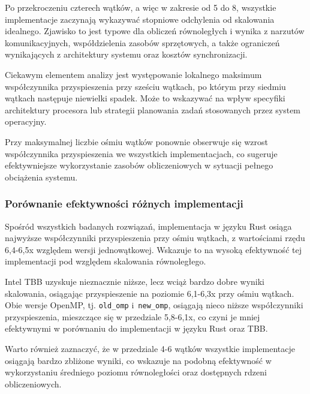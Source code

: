 Po przekroczeniu czterech wątków, a więc w zakresie od 5 do 8, wszystkie implementacje zaczynają wykazywać stopniowe odchylenia od skalowania idealnego. Zjawisko to jest typowe dla obliczeń równoległych i wynika z narzutów komunikacyjnych, współdzielenia zasobów sprzętowych, a także ograniczeń wynikających z architektury systemu oraz kosztów synchronizacji.

Ciekawym elementem analizy jest występowanie lokalnego maksimum współczynnika przyspieszenia przy sześciu wątkach, po którym przy siedmiu wątkach następuje niewielki spadek. Może to wskazywać na wpływ specyfiki architektury procesora lub strategii planowania zadań stosowanych przez system operacyjny.

Przy maksymalnej liczbie ośmiu wątków ponownie obserwuje się wzrost współczynnika przyspieszenia we wszystkich implementacjach, co sugeruje efektywniejsze wykorzystanie zasobów obliczeniowych w sytuacji pełnego obciążenia systemu.

\subsubsection{Porównanie efektywności różnych implementacji}
Spośród wszystkich badanych rozwiązań, implementacja w języku Rust osiąga najwyższe współczynniki przyspieszenia przy ośmiu wątkach, z wartościami rzędu 6,4-6,5x względem wersji jednowątkowej. Wskazuje to na wysoką efektywność tej implementacji pod względem skalowania równoległego.

Intel TBB uzyskuje nieznacznie niższe, lecz wciąż bardzo dobre wyniki skalowania, osiągając przyspieszenie na poziomie 6,1-6,3x przy ośmiu wątkach. Obie wersje OpenMP, tj. \texttt{old\_omp} i~\texttt{new\_omp}, osiągają nieco niższe współczynniki przyspieszenia, mieszczące się w przedziale 5,8-6,1x, co czyni je mniej efektywnymi w porównaniu do implementacji w języku Rust oraz TBB.

Warto również zaznaczyć, że w przedziale 4-6 wątków wszystkie implementacje osiągają bardzo zbliżone wyniki, co wskazuje na podobną efektywność w wykorzystaniu średniego poziomu równoległości oraz dostępnych rdzeni obliczeniowych.

